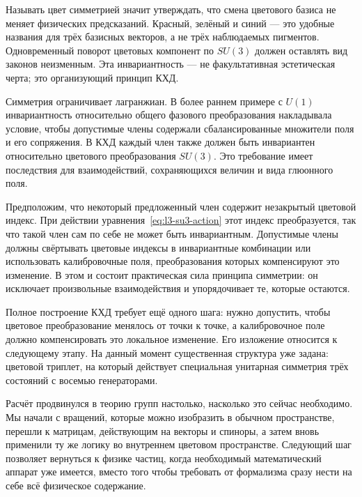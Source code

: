 Называть цвет симметрией значит утверждать, что смена цветового базиса не меняет физических предсказаний. Красный, зелёный и синий — это удобные названия для трёх базисных векторов, а не трёх наблюдаемых пигментов. Одновременный поворот цветовых компонент по \(SU(3)\) должен оставлять вид законов неизменным. Эта инвариантность — не факультативная эстетическая черта; это организующий принцип КХД.

Симметрия ограничивает лагранжиан. В более раннем примере с \(U(1)\) инвариантность относительно общего фазового преобразования накладывала условие, чтобы допустимые члены содержали сбалансированные множители поля и его сопряжения. В КХД каждый член также должен быть инвариантен относительно цветового преобразования \(SU(3)\). Это требование имеет последствия для взаимодействий, сохраняющихся величин и вида глюонного поля.

Предположим, что некоторый предложенный член содержит незакрытый цветовой индекс. При действии уравнения~\eqref{eq:l3-su3-action} этот индекс преобразуется, так что такой член сам по себе не может быть инвариантным. Допустимые члены должны свёртывать цветовые индексы в инвариантные комбинации или использовать калибровочные поля, преобразования которых компенсируют это изменение. В этом и состоит практическая сила принципа симметрии: он исключает произвольные взаимодействия и упорядочивает те, которые остаются.

Полное построение КХД требует ещё одного шага: нужно допустить, чтобы цветовое преобразование менялось от точки к точке, а калибровочное поле должно компенсировать это локальное изменение. Его изложение относится к следующему этапу. На данный момент существенная структура уже задана: цветовой триплет, на который действует специальная унитарная симметрия трёх состояний с восемью генераторами.

Расчёт продвинулся в теорию групп настолько, насколько это сейчас необходимо. Мы начали с вращений, которые можно изобразить в обычном пространстве, перешли к матрицам, действующим на векторы и спиноры, а затем вновь применили ту же логику во внутреннем цветовом пространстве. Следующий шаг позволяет вернуться к физике частиц, когда необходимый математический аппарат уже имеется, вместо того чтобы требовать от формализма сразу нести на себе всё физическое содержание.